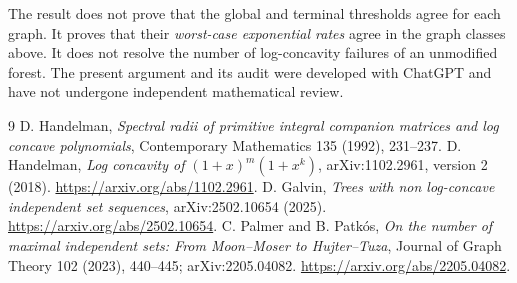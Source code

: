 \documentclass[11pt]{article}
\begin{document}
The result does not prove that the global and terminal thresholds agree
for each graph. It proves that their \emph{worst-case exponential rates}
agree in the graph classes above. It does not resolve the number of
log-concavity failures of an unmodified forest. The present argument and
its audit were developed with ChatGPT and have not undergone independent
mathematical review.

\begin{thebibliography}{9}
 D. Handelman, \emph{Spectral radii of primitive integral
companion matrices and log concave polynomials}, Contemporary Mathematics
135 (1992), 231--237.
 D. Handelman, \emph{Log concavity of $(1+x)^m(1+x^k)$},
arXiv:1102.2961, version 2 (2018).
\url{https://arxiv.org/abs/1102.2961}.
 D. Galvin, \emph{Trees with non log-concave independent set
sequences}, arXiv:2502.10654 (2025).
\url{https://arxiv.org/abs/2502.10654}.
 C. Palmer and B. Patk\'os, \emph{On the number of maximal
independent sets: From Moon--Moser to Hujter--Tuza}, Journal of Graph
Theory 102 (2023), 440--445; arXiv:2205.04082.
\url{https://arxiv.org/abs/2205.04082}.
\end{thebibliography}
\end{document}
